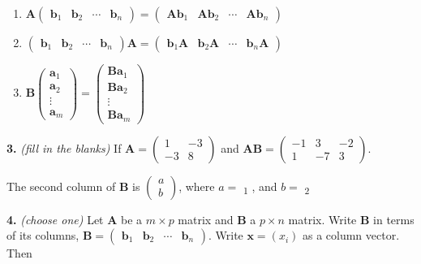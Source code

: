 \documentclass[10pt,a4paper]{article}
\begin{document}
\begin{enumerate}[label=(\Alph*)]
\item \(\mathbf{A}\begin{pmatrix}\mathbf{b}_1&\mathbf{b}_2&\cdots&\mathbf{b}_n\end{pmatrix}=\begin{pmatrix}\mathbf{Ab}_1&\mathbf{Ab}_2&\cdots&\mathbf{Ab}_n\end{pmatrix}\)
\item \(\begin{pmatrix}\mathbf{b}_1&\mathbf{b}_2&\cdots&\mathbf{b}_n\end{pmatrix}\mathbf{A}=\begin{pmatrix}\mathbf{b}_1\mathbf{A}&\mathbf{b}_2\mathbf{A}&\cdots&\mathbf{b}_n\mathbf{A}\end{pmatrix}\)
\item \(\mathbf{B}\begin{pmatrix}\mathbf{a}_1\\\mathbf{a}_2\\\vdots\\\mathbf{a}_m\end{pmatrix}=\begin{pmatrix}\mathbf{Ba}_1\\\mathbf{Ba}_2\\\vdots\\\mathbf{Ba}_m\end{pmatrix}\)
\end{enumerate}
\smallskip
\textbf{3.} \textit{(fill in the blanks)} If \(\mathbf{A}=\begin{pmatrix}1&-3\\-3&8\end{pmatrix}\) and \(\mathbf{AB}=\begin{pmatrix}-1&3&-2\\1&-7&3\end{pmatrix}\).

The second column of \(\mathbf{B}\) is \(\begin{pmatrix}a\\b\end{pmatrix}\), where \(a=\) \underline{\hspace{1.2cm}}\textsubscript{1} 
, and \(b=\) \underline{\hspace{1.2cm}}\textsubscript{2}

\smallskip
\textbf{4.} \textit{(choose one)} Let \(\mathbf{A}\) be a \(m\times p\) matrix and \(\mathbf{B}\) a \(p\times n\) matrix. Write \(\mathbf{B}\) in terms of its columns, \(\mathbf{B}=\begin{pmatrix}\mathbf{b}_1&\mathbf{b}_2&\cdots&\mathbf{b}_n\end{pmatrix}\). Write \(\mathbf{x}=(x_i)\) as a column vector. Then
\end{document}
